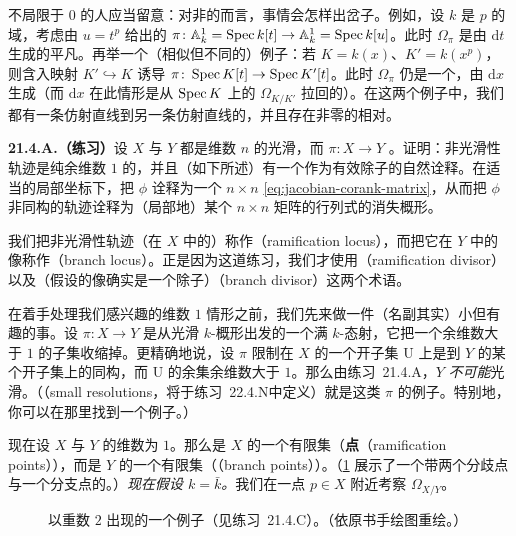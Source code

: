 不局限于\trCharacteristic{} $0$ 的人应当留意：对非\trSeparable{}的\trMorphism{}而言，事情会怎样出岔子。例如，设 $k$ 是\trCharacteristic{} $p$ 的域，考虑由 $u=t^p$ 给出的\trMap{} $\pi\colon\mathbb{A}^1_k=\operatorname{Spec} k[t]\to\mathbb{A}^1_k=\operatorname{Spec} k[u]$。此时 $\Omega_\pi$ 是由 $\mathrm{d}t$ 生成的平凡\trInvertibleSheaf。再举一个（相似但不同的）例子：若 $K=k(x)$、$K'=k(x^p)$，则含入映射 $K'\hookrightarrow K$ 诱导 $\pi\colon\operatorname{Spec} K[t]\to\operatorname{Spec} K'[t]$。此时 $\Omega_\pi$ 仍是一个\trInvertibleSheaf，由 $\mathrm{d}x$ 生成（而 $\mathrm{d}x$ 在此情形是从 $\operatorname{Spec} K$ 上的 $\Omega_{K/K'}$ 拉回的）。在这两个例子中，我们都有一条仿射直线到另一条仿射直线的\trMap，并且存在非零的相对\trTangentVector。

\textbf{21.4.A.（练习）}\quad 设 $X$ 与 $Y$ 都是维数 $n$ 的光滑\trVariety，而 $\pi\colon X\to Y$ \trGenericallySeparable。证明：非光滑性轨迹是纯余维数 $1$ 的，并且（如下所述）有一个作为有效除子的自然诠释。在适当的局部坐标下，把 $\phi$ 诠释为一个 $n\times n$ \trJacobianMatrix{} \eqref{eq:jacobian-corank-matrix}，从而把 $\phi$ 非同构的轨迹诠释为（局部地）某个 $n\times n$ 矩阵的行列式的消失概形。

我们把非光滑性轨迹（在 $X$ 中的）称作\textbf{\trRamificationLocus}（ramification locus），而把它在 $Y$ 中的像称作\textbf{\trBranchLocus}（branch locus）。正是因为这道练习，我们才使用\textbf{\trRamificationDivisor}（ramification divisor）以及（假设\trRamificationDivisor{}的像确实是一个除子）\textbf{\trBranchDivisor}（branch divisor）这两个术语。

在着手处理我们感兴趣的维数 $1$ 情形之前，我们先来做一件（名副其实）小但有趣的事。设 $\pi\colon X\to Y$ 是从光滑 $k$-概形出发的一个满 $k$-态射，它把一个余维数大于 $1$ 的子集收缩掉。更精确地说，设 $\pi$ 限制在 $X$ 的一个开子集 $\mathrm{U}$ 上是到 $Y$ 的某个开子集上的同构，而 $\mathrm{U}$ 的余集余维数大于 $1$。那么由\mbox{练习~21.4.A}，$Y$ \emph{不可能}光滑。（\emph{\trSmallResolution}（small resolutions，将于\mbox{练习~22.4.N}中定义）就是这类 $\pi$ 的例子。特别地，你可以在那里找到一个例子。）

现在设 $X$ 与 $Y$ 的维数为 $1$。那么\trRamificationLocus{}是 $X$ 的一个有限集（\textbf{\trRamification{}点}（ramification points）），而\trBranchLocus{}是 $Y$ 的一个有限集（\textbf{\trBranchPoint}（branch points））。（\cref{fig:branch-divisor-multiplicity} 展示了一个带两个分歧点与一个分支点的\trMorphism。）\emph{现在假设 $k=\bar{k}$。}我们在一点 $p\in X$ 附近考察 $\Omega_{X/Y}$。

\begin{figure}[htbp]
\centering
{}
\caption{\trBranchDivisor{}以重数 $2$ 出现的一个例子（见\mbox{练习~21.4.C}）。（依原书手绘图重绘。）}\label{fig:branch-divisor-multiplicity}
\end{figure}

